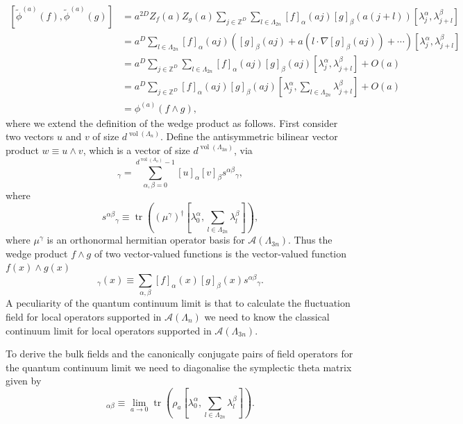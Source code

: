 \documentclass[prl,twocolumn,lengthcheck,superscriptaddress]{revtex4-1}
\newcommand{\tr}{\operatorname{tr}}
\newcommand{\vol}{\operatorname{vol}}
\theoremstyle{definition}
\theoremstyle{remark}
\begin{document}
\begin{equation}
	\begin{split}
		[\widetilde{\phi}^{(a)}(f), \widetilde{\phi}^{(a)}(g)] &= a^{2D}Z_f(a)Z_g(a)\sum_{j\in\mathbb{Z}^D}\sum_{l\in \Lambda_{2n}} [f]_\alpha(aj)[g]_\beta(a(j+l)) [\lambda_j^\alpha, \lambda_{j+l}^\beta] \\
		&= a^{D}\sum_{l\in \Lambda_{2n}} [f]_\alpha(aj)\left([g]_\beta(aj) + a \left(l \cdot \nabla [g]_\beta(aj)\right) + \cdots \right) [\lambda_j^\alpha, \lambda_{j+l}^\beta] \\
		&= a^{D}\sum_{j\in\mathbb{Z}^D}\sum_{l\in \Lambda_{2n}} [f]_\alpha(aj)[g]_\beta(aj) [\lambda_j^\alpha, \lambda_{j+l}^\beta] + O(a) \\
		&= a^{D}\sum_{j\in\mathbb{Z}^D} [f]_\alpha(aj)[g]_\beta(aj) \left[\lambda_j^\alpha, \sum_{l\in \Lambda_{2n}}\lambda_{j+l}^\beta\right] + O(a) \\
		&= \phi^{(a)}(f\wedge g),
	\end{split}
\end{equation} 
where we extend the definition of the wedge product as follows. First consider two vectors $u$ and $v$ of size $d^{\vol(\Lambda_n)}$.  Define the antisymmetric bilinear vector product $w \equiv u\wedge v$, which is a vector of size $d^{\vol(\Lambda_{3n})}$, via 
\begin{equation}
[u\wedge v]_{\gamma} = \sum_{\alpha,\beta=0}^{d^{\vol(\Lambda_n)}-1}[u]_\alpha[v]_\beta {s^{\alpha\beta}}_\gamma,
\end{equation} 
where
\begin{equation}
	{s^{\alpha\beta}}_\gamma \equiv \tr\left(({\mu^\gamma})^\dag   \left[\lambda^\alpha_0, \sum_{l\in \Lambda_{2n}}\lambda_{l}^\beta\right]\right),
\end{equation}
where ${\mu^\gamma}$ is an orthonormal hermitian operator basis for $\mathcal{A}(\Lambda_{3n})$.
Thus the wedge product $f\wedge g$ of two vector-valued functions is the vector-valued function $f(x)\wedge g(x)$
\begin{equation}
	[f\wedge g]_\gamma(x) \equiv \sum_{\alpha,\beta} [f]_\alpha(x)[g]_\beta(x) {s^{\alpha\beta}}_\gamma.
\end{equation}
A peculiarity of the quantum continuum limit is that to calculate the fluctuation field for local operators supported in $\mathcal{A}(\Lambda_n)$ we need to know the classical continuum limit for local operators supported in $\mathcal{A}(\Lambda_{3n})$.

To derive the bulk fields and the canonically conjugate pairs of field operators for the quantum continuum limit we need to diagonalise the symplectic theta matrix given by
\begin{equation}
	[\Theta]_{\alpha\beta}  \equiv \lim_{a\rightarrow 0} \tr\left(\rho_a \left[\lambda^\alpha_0, \sum_{l\in \Lambda_{2n}}\lambda_{l}^\beta\right] \right).
\end{equation}
\end{document}
